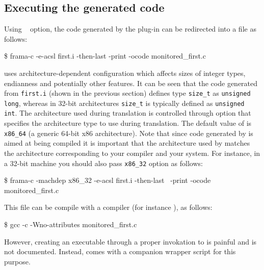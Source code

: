 
\subsection{Executing the generated code}
\label{sec:exec}

Using  \framac~\cite{userman} option, the code generated by the
\eacsl plug-in can be redirected into a file as follows:
\begin{shell}
\$ frama-c -e-acsl first.i -then-last -print -ocode monitored_first.c
\end{shell}

\framac uses architecture-dependent configuration which
affects sizes of integer types, endianness and potentially other features.  It
can be seen that the code generated from \texttt{first.i} (shown in the
previous section) defines \C type \texttt{size\_t} as \texttt{unsigned long}, whereas
in 32-bit architectures \texttt{size\_t} is typically defined as
\texttt{unsigned int}. The architecture used during \framac translation is
controlled through \framac {} option that specifies the
architecture type to use during translation.  The default value of
 is \texttt{x86\_64} (a generic 64-bit x86 architecture).
Note that since code generated by \eacsl is aimed at being compiled it is
important that the architecture used by \framac matches the architecture
corresponding to your compiler and your system. For instance, in a 32-bit
machine you should also pass
 \texttt{x86\_32} option as follows:
\begin{shell}
\$ frama-c -machdep x86_32 -e-acsl first.i -then-last \
  -print -ocode monitored_first.c
\end{shell}

This file can be compile with a \C compiler (for instance \gcc), as follows:

\lstset{escapechar=£}
\begin{shell}
\$ gcc -c -Wno-attributes monitored_first.c
\end{shell}

However, creating an executable through a proper invokation to \gcc is painful
and is not documented. Instead, \eacsl comes with a companion wrapper script for
this purpose.

